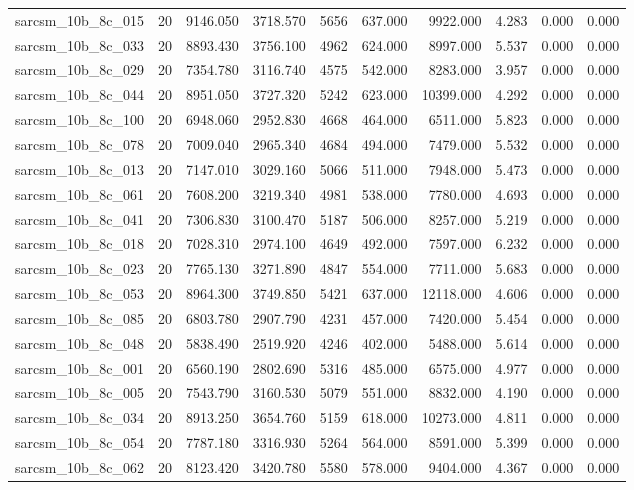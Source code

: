 \begin{tabular}{lrrrrrrrrr}
sarcsm\_10b\_8c\_015 & 20 & 9146.050 & 3718.570 & 5656 & 637.000 & 9922.000 & 4.283 & 0.000 & 0.000 \\
sarcsm\_10b\_8c\_033 & 20 & 8893.430 & 3756.100 & 4962 & 624.000 & 8997.000 & 5.537 & 0.000 & 0.000 \\
sarcsm\_10b\_8c\_029 & 20 & 7354.780 & 3116.740 & 4575 & 542.000 & 8283.000 & 3.957 & 0.000 & 0.000 \\
sarcsm\_10b\_8c\_044 & 20 & 8951.050 & 3727.320 & 5242 & 623.000 & 10399.000 & 4.292 & 0.000 & 0.000 \\
sarcsm\_10b\_8c\_100 & 20 & 6948.060 & 2952.830 & 4668 & 464.000 & 6511.000 & 5.823 & 0.000 & 0.000 \\
sarcsm\_10b\_8c\_078 & 20 & 7009.040 & 2965.340 & 4684 & 494.000 & 7479.000 & 5.532 & 0.000 & 0.000 \\
sarcsm\_10b\_8c\_013 & 20 & 7147.010 & 3029.160 & 5066 & 511.000 & 7948.000 & 5.473 & 0.000 & 0.000 \\
sarcsm\_10b\_8c\_061 & 20 & 7608.200 & 3219.340 & 4981 & 538.000 & 7780.000 & 4.693 & 0.000 & 0.000 \\
sarcsm\_10b\_8c\_041 & 20 & 7306.830 & 3100.470 & 5187 & 506.000 & 8257.000 & 5.219 & 0.000 & 0.000 \\
sarcsm\_10b\_8c\_018 & 20 & 7028.310 & 2974.100 & 4649 & 492.000 & 7597.000 & 6.232 & 0.000 & 0.000 \\
sarcsm\_10b\_8c\_023 & 20 & 7765.130 & 3271.890 & 4847 & 554.000 & 7711.000 & 5.683 & 0.000 & 0.000 \\
sarcsm\_10b\_8c\_053 & 20 & 8964.300 & 3749.850 & 5421 & 637.000 & 12118.000 & 4.606 & 0.000 & 0.000 \\
sarcsm\_10b\_8c\_085 & 20 & 6803.780 & 2907.790 & 4231 & 457.000 & 7420.000 & 5.454 & 0.000 & 0.000 \\
sarcsm\_10b\_8c\_048 & 20 & 5838.490 & 2519.920 & 4246 & 402.000 & 5488.000 & 5.614 & 0.000 & 0.000 \\
sarcsm\_10b\_8c\_001 & 20 & 6560.190 & 2802.690 & 5316 & 485.000 & 6575.000 & 4.977 & 0.000 & 0.000 \\
sarcsm\_10b\_8c\_005 & 20 & 7543.790 & 3160.530 & 5079 & 551.000 & 8832.000 & 4.190 & 0.000 & 0.000 \\
sarcsm\_10b\_8c\_034 & 20 & 8913.250 & 3654.760 & 5159 & 618.000 & 10273.000 & 4.811 & 0.000 & 0.000 \\
sarcsm\_10b\_8c\_054 & 20 & 7787.180 & 3316.930 & 5264 & 564.000 & 8591.000 & 5.399 & 0.000 & 0.000 \\
sarcsm\_10b\_8c\_062 & 20 & 8123.420 & 3420.780 & 5580 & 578.000 & 9404.000 & 4.367 & 0.000 & 0.000 \\

\end{tabular}
